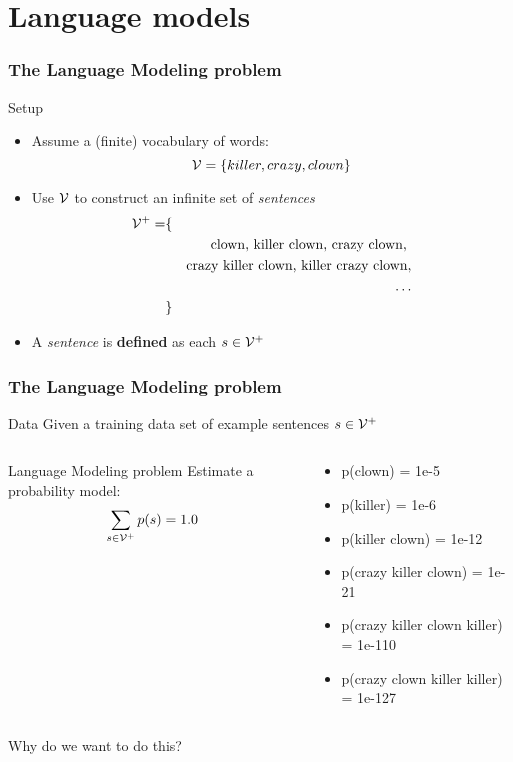 




\section{Language models}

\begin{frame}
\frametitle{The Language Modeling problem}
\begin{block}{Setup}
\begin{itemize}[<+->]
\item Assume a (finite) vocabulary of words:
\[ {\cal V} = \{ killer, crazy, clown \} \]
\item Use ${\cal V}$ to construct an infinite set of \textit{sentences} 
\begin{eqnarray*} 
{\cal V}^+ = & \{ & \\
&& \mbox{clown, killer clown, crazy clown, } \\
&& \mbox{crazy killer clown, killer crazy clown}, \\
&& \ldots \\
& \} &
\end{eqnarray*}
\item A \textit{sentence} is \textbf{defined} as each $s \in {\cal V}^+$
\end{itemize}
\end{block}
\end{frame}

\begin{frame}
\frametitle{The Language Modeling problem}
\begin{block}{Data}
Given a training data set of example sentences $s \in {\cal V}^+$
\end{block}
\pause
\begin{columns}
    \begin{block}{Language Modeling problem}
    Estimate a probability model:
    \[ \sum_{s \in {\cal V}^+} p(s) = 1.0 \]
    \end{block}
    \begin{block}{}
    \begin{itemize}
    \item p(clown) = 1e-5
    \item p(killer) = 1e-6
    \item {\small p(killer clown) = 1e-12}
    \item {\footnotesize p(crazy killer clown) = 1e-21}
    \item {\tiny p(crazy killer clown killer) = 1e-110}
    \item {\tiny p(crazy clown killer killer) = 1e-127}
    \end{itemize}
    \end{block}
\end{columns}
\begin{alertblock}{Why do we want to do this?}
\end{alertblock}
\end{frame}

